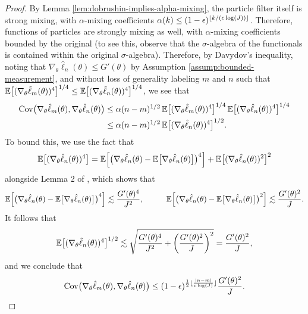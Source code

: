 \begin{proof}
By Lemma \ref{lem:dobrushin-implies-alpha-mixing}, the particle filter itself is strong mixing, with $\alpha$-mixing coefficients $\alpha(k) \leq (1-\epsilon)^{\lfloor k/(c\log(J)) \rfloor}$. Therefore, functions of particles are strongly mixing as well, with $\alpha$-mixing coefficients bounded by the original (to see this, observe that the $\sigma$-algebra of the functionals is contained within the original $\sigma$-algebra). Therefore, by Davydov's inequality, noting that $\nabla_\theta\hat\ell_n(\theta)\leq G'(\theta)$ by Assumption \ref{assump:bounded-measurement}, and without loss of generality labeling $m$ and $n$ such that $\mathbb{E}\big[(\nabla_\theta\hat\ell_m(\theta))^4\big]^{1/4}\leq\mathbb{E}\big[(\nabla_\theta\hat\ell_n(\theta))^4\big]^{1/4}$, we see that
\begin{align}
    \mathrm{Cov}\big(\nabla_\theta\hat\ell_m(\theta), \nabla_\theta\hat\ell_n(\theta)\big) 
    &\leq \alpha(n-m)^{1/2} \, \mathbb{E}\big[(\nabla_\theta\hat\ell_m(\theta))^4\big]^{1/4}
    \,
    \mathbb{E}\big[(\nabla_\theta\hat\ell_n(\theta))^4\big]^{1/4}\\
    &\leq \alpha(n-m)^{1/2}\, \mathbb{E}\big[(\nabla_\theta\hat\ell_n(\theta))^4\big]^{1/2}.
\end{align}
To bound this, we use the fact that 
\begin{equation}
\mathbb{E}\big[(\nabla_\theta\hat\ell_n(\theta))^4\big] = \mathbb{E}\Big[\big(\nabla_\theta\hat\ell_n(\theta)-\mathbb{E}\big[\nabla_\theta\hat\ell_n(\theta)\big]\big)^4\Big]+\mathbb{E}\big[(\nabla_\theta\hat\ell_n(\theta))^2\big]^2
\end{equation}
alongside Lemma 2 of \cite{karjalainen23}, which shows that
\begin{equation}
\E\Big[\big(\nabla_\theta\hat\ell_n(\theta)-\E\big[\nabla_\theta\hat\ell_n(\theta)\big]\big)^4\Big] \lesssim \frac{G'(\theta)^4}{J^2}, \hspace{10mm} \E\Big[\big(\nabla_\theta\hat\ell_n(\theta)-\E\big[\nabla_\theta\hat\ell_n(\theta)\big]\big)^2\Big] \lesssim \frac{G'(\theta)^2}{J}.
\end{equation}
It follows that 
\begin{equation}
\mathbb{E}\big[(\nabla_\theta\hat\ell_n(\theta))^4\big]^{1/2} \lesssim  \sqrt{\frac{G'(\theta)^4}{J^2}+\left(\frac{G'(\theta)^2}{J}\right)^2} = \frac{G'(\theta)^2}{J},
\end{equation}
and we conclude that 
\begin{equation}
\mathrm{Cov}\big(\nabla_\theta\hat\ell_m(\theta), \nabla_\theta\hat\ell_n(\theta)\big) \leq (1-\epsilon)^{\frac{1}{2}\lfloor \frac{|n-m|}{c\log(J)} \rfloor}\frac{G'(\theta)^2}{J}.
\end{equation}

\end{proof}
